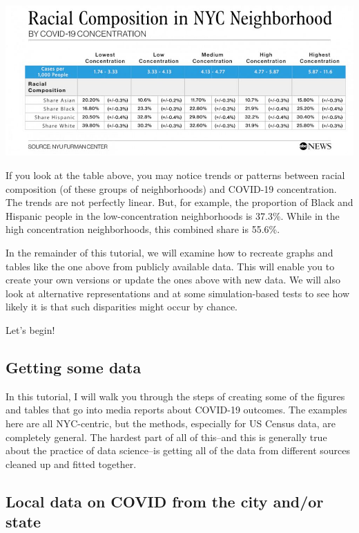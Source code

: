 \documentclass[openany]{book}
\begin{document}
\includegraphics{images/abc_COVID19RacialComp_v02_KA_hpEmbed_37x16_992.jpg}

If you look at the table above, you may notice trends or patterns between racial composition (of these groups of neighborhoods) and COVID-19 concentration. The trends are not perfectly linear. But, for example, the proportion of Black and Hispanic people in the low-concentration neighborhoods is 37.3\%. While in the high concentration neighborhoods, this combined share is 55.6\%.

In the remainder of this tutorial, we will examine how to recreate graphs and tables like the one above from publicly available data. This will enable you to create your own versions or update the ones above with new data. We will also look at alternative representations and at some simulation-based tests to see how likely it is that such disparities might occur by chance.

Let's begin!

\hypertarget{getting-some-data}{%
\subsection*{Getting some data}\label{getting-some-data}}

In this tutorial, I will walk you through the steps of creating some of the figures and tables that go into media reports about COVID-19 outcomes. The examples here are all NYC-centric, but the methods, especially for US Census data, are completely general. The hardest part of all of this--and this is generally true about the practice of data science--is getting all of the data from different sources cleaned up and fitted together.

\hypertarget{local-data-on-covid-from-the-city-andor-state}{%
\subsection*{Local data on COVID from the city and/or state}\label{local-data-on-covid-from-the-city-andor-state}}
\end{document}
